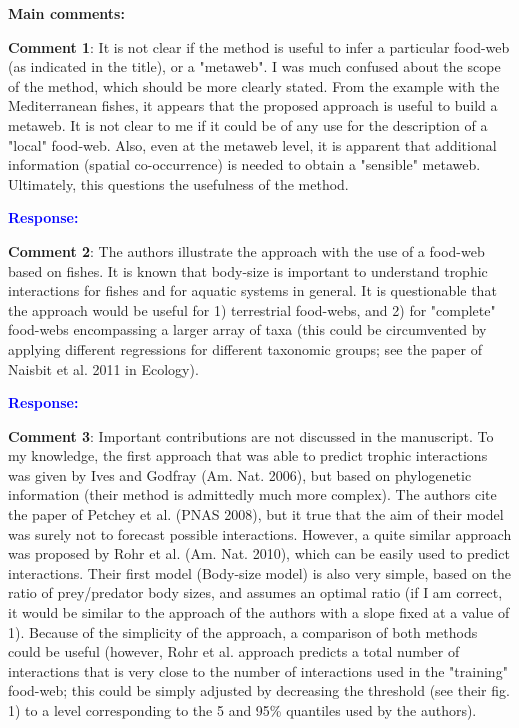 \documentclass [12pt,onecolumn,twoside,openright]{report}
\begin{document}
\begin{onehalfspacing}
\medskip \textbf{\large{Main comments:}}

\medskip \textbf{Comment 1}: It is not clear if the method is
useful to infer a particular food-web (as indicated in the title), or a
"metaweb". I was much confused about the scope of the method, which should be
more clearly stated. From the example with the Mediterranean fishes, it appears
that the proposed approach is useful to build a metaweb. It is not clear to me
if it could be of any use for the description of a "local" food-web. Also, even
at the metaweb level, it is apparent that additional information (spatial
co-occurrence) is needed to obtain a "sensible" metaweb. Ultimately, this
questions the usefulness of the method.

\medskip \textcolor{blue}{\textbf{Response:}} \textit{\textcolor{blue}{}}

\medskip \textbf{Comment 2}: The authors illustrate the
approach with the use of a food-web based on fishes. It is known that body-size
is important to understand trophic interactions for fishes and for aquatic
systems in general. It is questionable that the approach would be useful for 1)
terrestrial food-webs, and 2) for "complete" food-webs encompassing a larger
array of taxa (this could be circumvented by applying different regressions for
different taxonomic groups; see the paper of Naisbit et al. 2011 in Ecology).

\medskip \textcolor{blue}{\textbf{Response:}} \textit{\textcolor{blue}{}}

\medskip \textbf{Comment 3}: Important contributions are not
discussed in the manuscript. To my knowledge, the first approach that was able
to predict trophic interactions was given by Ives and Godfray (Am. Nat. 2006),
but based on phylogenetic information (their method is admittedly much more
complex). The authors cite the paper of Petchey et al. (PNAS 2008), but it true
that the aim of their model was surely not to forecast possible interactions.
However, a quite similar approach was proposed by Rohr et al. (Am. Nat. 2010),
which can be easily used to predict interactions. Their first model (Body-size
model) is also very simple, based on the ratio of prey/predator body sizes, and
assumes an optimal ratio (if I am correct, it would be similar to the approach
of the authors with a slope fixed at a value of 1). Because of the simplicity of
the approach, a comparison of both methods could be useful (however, Rohr et al.
approach predicts a total number of interactions that is very close to the
number of interactions used in the "training" food-web; this could be simply
adjusted by decreasing the threshold (see their fig. 1) to a level corresponding
to the 5 and 95\% quantiles used by the authors).


\end{onehalfspacing}
\end{document}
